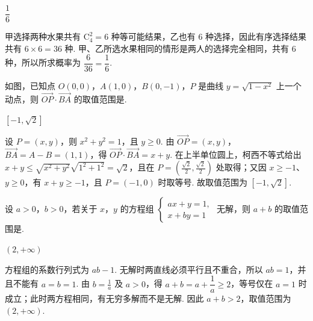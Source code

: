 \begin{answer}
\(\dfrac{1}{6}\)
\end{answer}

\begin{solution}
甲选择两种水果共有 \(\mathrm C_4^2=6\) 种等可能结果，乙也有 \(6\) 种选择，因此有序选择结果共有 \(6\times6=36\) 种. 甲、乙所选水果相同的情形是两人的选择完全相同，共有 \(6\) 种，所以所求概率为 \(\dfrac6{36}=\dfrac16\).
\end{solution}

\begin{problem}
如图，已知点 \(O(0,0)\)，\(A(1,0)\)，\(B(0,-1)\)，\(P\) 是曲线 \(y=\sqrt{1-x^2}\) 上一个动点，则 \(\overrightarrow{OP}\cdot\overrightarrow{BA}\) 的取值范围是\fillinblank{}.

\end{problem}

\begin{answer}
\([-1,\sqrt{2}]\)
\end{answer}

\begin{solution}
设 \(P=(x,y)\)，则 \(x^2+y^2=1\)，且 \(y\geqslant0\). 由 \(\overrightarrow{OP}=(x,y)\)，\(\overrightarrow{BA}=A-B=(1,1)\)，得 \(\overrightarrow{OP}\cdot\overrightarrow{BA}=x+y\). 在上半单位圆上，柯西不等式给出 \(x+y\leqslant\sqrt{x^2+y^2}\sqrt{1^2+1^2}=\sqrt2\)，且在 \(P=(\frac{\sqrt2}{2},\frac{\sqrt2}{2})\) 处取得；又因 \(x\geqslant-1\)、\(y\geqslant0\)，有 \(x+y\geqslant-1\)，且 \(P=(-1,0)\) 时取等号. 故取值范围为 \([-1,\sqrt2]\).
\end{solution}

\begin{problem}
设 \(a>0\)，\(b>0\)，若关于 \(x\)，\(y\) 的方程组
\(
\begin{cases}
ax+y=1,\\
x+by=1
\end{cases}
\)
无解，则 \(a+b\) 的取值范围是\fillinblank{}.
\end{problem}

\begin{answer}
\((2,+\infty)\)
\end{answer}

\begin{solution}
方程组的系数行列式为 \(ab-1\). 无解时两直线必须平行且不重合，所以 \(ab=1\)，并且不能有 \(a=b=1\). 由 \(b=\frac{1}{a}\) 及 \(a>0\)，得 \(a+b=a+\dfrac1a\geqslant2\)，等号仅在 \(a=1\) 时成立；此时两方程相同，有无穷多解而不是无解. 因此 \(a+b>2\)，取值范围为 \((2,+\infty)\).
\end{solution}

